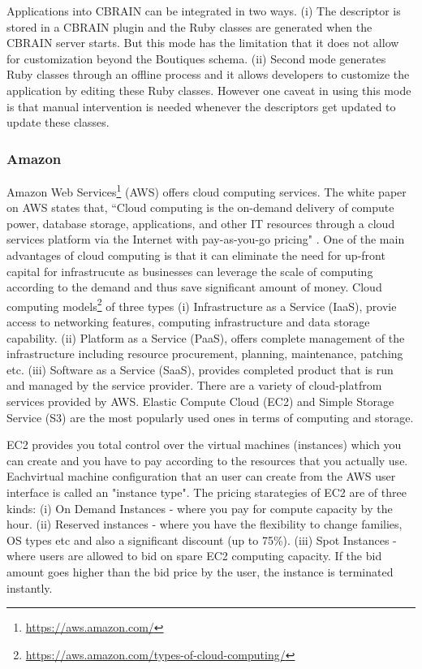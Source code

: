 Applications into CBRAIN can be integrated in two ways. (i) The descriptor is stored in a CBRAIN plugin and the Ruby classes are generated when the CBRAIN server starts. But this mode has the limitation that it does not allow for customization beyond the Boutiques schema. (ii) Second mode generates Ruby classes through an offline process and it allows developers to customize the application by editing these Ruby classes. However one caveat in using this mode is that manual intervention is needed whenever the descriptors get updated to update these classes.
 
\subsubsection{Amazon}
Amazon Web Services\footnote{\url{https://aws.amazon.com/}} (AWS) offers cloud computing services. The white paper on AWS \cite{Amazon-Web-Services} states that, ``Cloud computing is the on-demand delivery of compute power, database storage, applications, and other IT resources through a cloud services platform via the Internet with pay-as-you-go pricing" \cite{Amazon-Web-Services}. One of the main advantages of cloud computing is that it can eliminate the need for up-front capital for infrastrucute as businesses can leverage the scale of computing according to the demand and thus save significant amount of money. Cloud computing models\footnote{\url{https://aws.amazon.com/types-of-cloud-computing/}} of three types (i) Infrastructure as a Service (IaaS), provie access to networking features, computing infrastructure and data storage capability. (ii) Platform as a Service (PaaS), offers complete management of the infrastructure including resource procurement, planning, maintenance, patching etc. (iii) Software as a Service (SaaS), provides completed product that is run and managed by the service provider. There are a variety of cloud-platfrom services provided by AWS. Elastic Compute Cloud (EC2) and Simple Storage Service (S3) are the most popularly used ones in terms of computing and storage.

EC2 provides you total control over the virtual machines (instances) which you can create and you have to pay according to the resources that you actually use. Eachvirtual machine configuration that an user can create from the AWS user interface is called an "instance type". The pricing starategies of EC2 are of three kinds: (i) On Demand Instances - where you pay for compute capacity by the hour. (ii) Reserved instances - where you have the flexibility to change families, OS types etc and also a significant discount (up to 75\%). (iii) Spot Instances - where users are allowed to bid on spare EC2 computing capacity. If the bid amount goes higher than the bid price by the user, the instance is terminated instantly.

